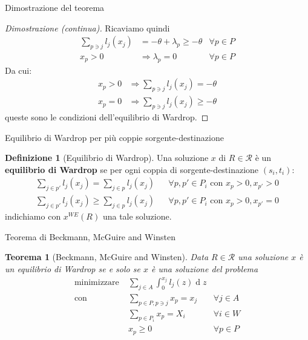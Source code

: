 \documentclass{beamer}
\newcounter{counter1}
\theoremstyle{plain}
\newtheorem{myteo}[counter1]{Teorema}
\theoremstyle{definition}
\newtheorem{mydef}[counter1]{Definizione}
\theoremstyle{remark}
\DeclareMathOperator{\de}{d}
\begin{document}
\begin{frame}{Dimostrazione del teorema}
  \begin{proof}[Dimostrazione (continua)]
    Ricaviamo quindi
    \begin{align*}
      \sum _{p\ni j} l_j(x_j) &= -\theta + \lambda _p \ge -\theta &
                                                \forall p\in P  \\
      x_p > 0 &\Rightarrow \lambda _p =0 & \forall p\in P
    \end{align*}
    Da cui:
    \begin{align*}
      x_p > 0 & \Rightarrow \sum _{p\ni j} l_j(x_j) = -\theta \\
      x_p = 0 & \Rightarrow \sum _{p\ni j} l_j(x_j) \ge -\theta
    \end{align*}
    queste sono le condizioni dell'equilibrio di Wardrop.
  \end{proof}
\end{frame}

\begin{frame}{Equilibrio di Wardrop per più coppie sorgente-destinazione}
  \begin{mydef}[Equilibrio di Wardrop]
    Una soluzione $x$ di $R\in \mathcal{R}$ è un \textbf{equilibrio di
      Wardrop} se per ogni coppia di sorgente-destinazione
    $(s_i,t_i)$:
    \begin{align*}
      \sum _{j\in p'} l_j(x_j) = \sum _{j\in p} l_j(x_j) & & \forall
                                                             p,p'\in P_i \text{ con } x_p >0, x_{p'} >0 \\
      \sum _{j\in p'} l_j(x_j) \ge \sum _{j\in p} l_j(x_j) & & \forall
                                                               p,p'\in P_i \text{ con } x_p >0, x_{p'} =0 
    \end{align*}
    indichiamo con $x^{WE}(R)$ una tale soluzione.
  \end{mydef}  
\end{frame}

\begin{frame}{Teorema di Beckmann, McGuire and Winsten}
  \begin{myteo}[Beckmann, McGuire and Winsten]
    Data $R\in \mathcal{R}$ una soluzione $x$ è un equilibrio di
    Wardrop se e solo se $x$ è una soluzione del problema
    \begin{align*}
        \text{minimizzare} \;&  \sum _{j\in A} \int _0 ^ {x_j}
        l_j(z)\de z \\
        \text{con} \;& \sum _{p\in P, p\ni j} x_p = x_j&\forall j\in
        A\\
        & \sum _{p\in P_i} x_p = X_i& \forall i\in W\\
        & x_p \ge 0&\forall p\in P        
    \end{align*}
  \end{myteo}
\end{frame}
\end{document}
